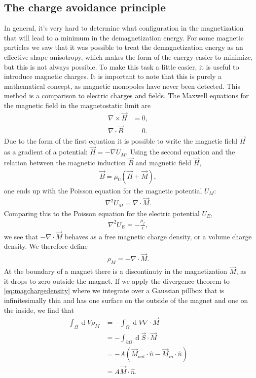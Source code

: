 \documentclass[12pt, a4paper, twoside, openright]{article}		%
\renewcommand{\d}[1]{\ensuremath{\operatorname{d}\!{#1}}}
\numberwithin{equation}{section}
\begin{document}
\subsection{The charge avoidance principle}
In general, it's very hard to determine what configuration in the magnetization that will lead to a minimum in the demagnetization energy. For some magnetic particles we saw that it was possible to treat the demagnetization energy as an effective shape anisotropy, which makes the form of the energy easier to minimize, but this is not always possible. To make this task a little easier, it is useful to introduce magnetic charges. It is important to note that this is purely a mathematical concept, as magnetic monopoles have never been detected. This method is a comparison to electric charges and fields. The Maxwell equations for the magnetic field in the magnetostatic limit are
\begin{align}
\nabla \times \vec{H} &= 0, \\
\nabla \cdot \vec{B} &= 0.
\end{align}
Due to the form of the first equation it is possible to write the magnetic field $\vec{H}$ as a gradient of a potential: $\vec{H} = -\nabla U_M$. Using the second equation and the relation between the magnetic induction $\vec{B}$ and magnetic field $\vec{H}$, 
\begin{align}
\vec{B} = \mu_0(\vec{H}+\vec{M}),
\end{align}
one ends up with the Poisson equation for the magnetic potential $U_M$:
\begin{align}
\nabla^2 U_M = \nabla \cdot \vec{M}.
\end{align}
Comparing this to the Poisson equation for the electric potential $U_E$,
\begin{align}
\nabla^2 U_E = -\frac{\rho_f}{\epsilon},
\end{align}
we see that $-\nabla \cdot \vec{M}$ behaves as a free magnetic charge density, or a volume charge density. We therefore define
\begin{align}
\label{eq:magchargedensity}
\rho_M = - \nabla \cdot \vec{M}.
\end{align}
At the boundary of a magnet there is a discontinuty in the magnetization $\vec{M}$, as it drops to zero outside the magnet. If we apply the divergence theorem to \eqref{eq:magchargedensity} where we integrate over a Gaussian pillbox that is infinitesimally thin and has one surface on the outside of the magnet and one on the inside, we find that
\begin{align*}
\int_{\Omega} \d V \rho_M  &= -\int_{\Omega} \d V \nabla \cdot \vec{M} \\
&= -\int_{\partial \Omega} \d {\vec{S}}\cdot\vec{M} \\
&= -A(\vec{M}_{out}\cdot\hat{n} - \vec{M}_{in} \cdot \hat{n}) \\
&= A \vec{M} \cdot\hat{n}.
\end{align*}
\end{document}
